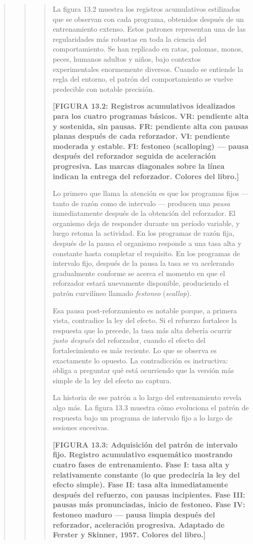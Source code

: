 \documentclass[
  letterpaper,
  DIV=11,
  numbers=noendperiod]{scrreprt}
\begin{document}
\begin{tcolorbox}[enhanced jigsaw, arc=.35mm, bottomrule=.15mm, breakable, colback=white, colframe=quarto-callout-note-color-frame, left=2mm, leftrule=.75mm, opacityback=0, rightrule=.15mm, toprule=.15mm]
\begin{quote}
\begin{quote}
\begin{quote}
La figura 13.2 muestra los registros acumulativos estilizados que se
observan con cada programa, obtenidos después de un entrenamiento
extenso. Estos patrones representan una de las regularidades más
robustas en toda la ciencia del comportamiento. Se han replicado en
ratas, palomas, monos, peces, humanos adultos y niños, bajo contextos
experimentales enormemente diversos. Cuando se entiende la regla del
entorno, el patrón del comportamiento se vuelve predecible con notable
precisión.

\textbf{{[}FIGURA 13.2: Registros acumulativos idealizados para los
cuatro programas básicos. VR: pendiente alta y sostenida, sin pausas.
FR: pendiente alta con pausas planas después de cada reforzador. VI:
pendiente moderada y estable. FI: festoneo (scalloping) --- pausa
después del reforzador seguida de aceleración progresiva. Las marcas
diagonales sobre la línea indican la entrega del reforzador. Colores del
libro.{]}}

Lo primero que llama la atención es que los programas fijos --- tanto de
razón como de intervalo --- producen una \emph{pausa} inmediatamente
después de la obtención del reforzador. El organismo deja de responder
durante un período variable, y luego retoma la actividad. En los
programas de razón fija, después de la pausa el organismo responde a una
tasa alta y constante hasta completar el requisito. En los programas de
intervalo fijo, después de la pausa la tasa se va acelerando
gradualmente conforme se acerca el momento en que el reforzador estará
nuevamente disponible, produciendo el patrón curvilíneo llamado
\emph{festoneo} (\emph{scallop}).

Esa pausa post-reforzamiento es notable porque, a primera vista,
contradice la ley del efecto. Si el refuerzo fortalece la respuesta que
lo precede, la tasa más alta debería ocurrir \emph{justo después} del
reforzador, cuando el efecto del fortalecimiento es más reciente. Lo que
se observa es exactamente lo opuesto. La contradicción es instructiva:
obliga a preguntar qué está ocurriendo que la versión más simple de la
ley del efecto no captura.

La historia de ese patrón a lo largo del entrenamiento revela algo más.
La figura 13.3 muestra cómo evoluciona el patrón de respuesta bajo un
programa de intervalo fijo a lo largo de sesiones sucesivas.

\textbf{{[}FIGURA 13.3: Adquisición del patrón de intervalo fijo.
Registro acumulativo esquemático mostrando cuatro fases de
entrenamiento. Fase I: tasa alta y relativamente constante (lo que
predeciría la ley del efecto simple). Fase II: tasa alta inmediatamente
después del refuerzo, con pausas incipientes. Fase III: pausas más
pronunciadas, inicio de festoneo. Fase IV: festoneo maduro --- pausa
limpia después del reforzador, aceleración progresiva. Adaptado de
Ferster y Skinner, 1957. Colores del libro.{]}}


\end{quote}
\end{quote}
\end{quote}
\end{tcolorbox}
\end{document}
